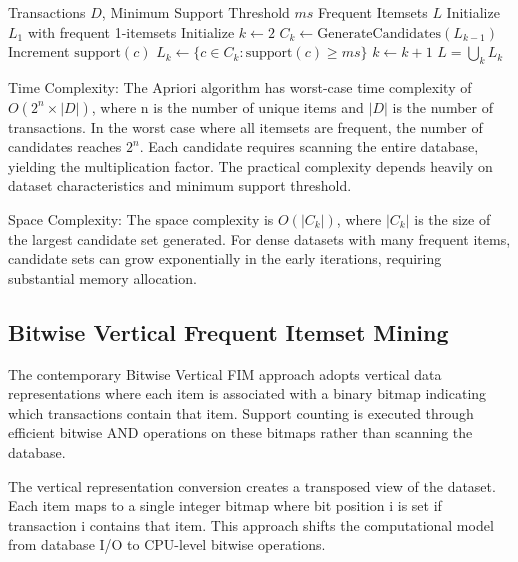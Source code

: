 \documentclass[conference]{IEEEtran}
\begin{document}
\begin{algorithm}
\caption{Classical Apriori Algorithm}
\begin{algorithmic}[1]
\REQUIRE Transactions $D$, Minimum Support Threshold $ms$
\ENSURE Frequent Itemsets $L$
\STATE Initialize $L_1$ with frequent 1-itemsets
\STATE Initialize $k \gets 2$
    \STATE $C_k \gets \text{GenerateCandidates}(L_{k-1})$
                \STATE Increment $\text{support}(c)$
            \ENDIF
        \ENDFOR
    \ENDFOR
    \STATE $L_k \gets \{c \in C_k : \text{support}(c) \geq ms\}$
    \STATE $k \gets k + 1$
\ENDWHILE
\RETURN $L = \bigcup_k L_k$
\end{algorithmic}
\end{algorithm}

Time Complexity: The Apriori algorithm has worst-case time complexity of $O(2^n \times |D|)$, where n is the number of unique items and $|D|$ is the number of transactions. In the worst case where all itemsets are frequent, the number of candidates reaches $2^n$. Each candidate requires scanning the entire database, yielding the multiplication factor. The practical complexity depends heavily on dataset characteristics and minimum support threshold.

Space Complexity: The space complexity is $O(|C_k|)$, where $|C_k|$ is the size of the largest candidate set generated. For dense datasets with many frequent items, candidate sets can grow exponentially in the early iterations, requiring substantial memory allocation.

\subsection{Bitwise Vertical Frequent Itemset Mining}

The contemporary Bitwise Vertical FIM approach adopts vertical data representations where each item is associated with a binary bitmap indicating which transactions contain that item. Support counting is executed through efficient bitwise AND operations on these bitmaps rather than scanning the database.

The vertical representation conversion creates a transposed view of the dataset. Each item maps to a single integer bitmap where bit position i is set if transaction i contains that item. This approach shifts the computational model from database I/O to CPU-level bitwise operations.
\end{document}
